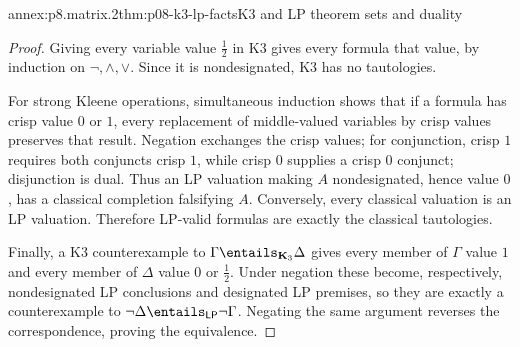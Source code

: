 \begin{annexitem}{annex:p8.matrix.2}{thm:p08-k3-lp-facts}{K3 and LP theorem sets and duality}
\begin{proof}
Giving every variable value \(\tfrac12\) in K3 gives every formula that value,
by induction on \(\neg,\land,\lor\).  Since it is nondesignated, K3 has no
tautologies.

For strong Kleene operations, simultaneous induction shows that if a formula
has crisp value \(0\) or \(1\), every replacement of middle-valued variables
by crisp values preserves that result.  Negation exchanges the crisp values;
for conjunction, crisp \(1\) requires both conjuncts crisp \(1\), while crisp
\(0\) supplies a crisp \(0\) conjunct; disjunction is dual.  Thus an LP
valuation making \(A\) nondesignated, hence value \(0\), has a classical
completion falsifying \(A\).  Conversely, every classical valuation is an LP
valuation.  Therefore LP-valid formulas are exactly the classical tautologies.

Finally, a K3 counterexample to
\(\Gamma\entails_{\mathbf K_3}\Delta\) gives every member of \(\Gamma\) value \(1\) and
every member of \(\Delta\) value \(0\) or \(\tfrac12\).  Under negation these
become, respectively, nondesignated LP conclusions and designated LP premises,
so they are exactly a counterexample to
\(\neg\Delta\entails_{\mathsf{LP}}\neg\Gamma\).  Negating the same argument
reverses the correspondence, proving the equivalence.
\end{proof}
\end{annexitem}
